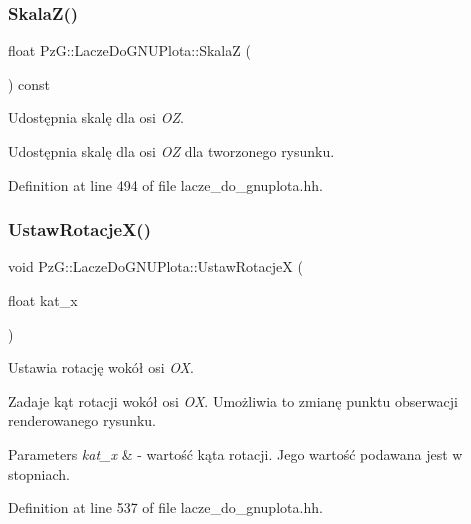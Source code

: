 \subsubsection{\texorpdfstring{Skala\+Z()}{SkalaZ()}}
{\footnotesize\ttfamily float Pz\+G\+::\+Lacze\+Do\+G\+N\+U\+Plota\+::\+SkalaZ (\begin{DoxyParamCaption}{ }\end{DoxyParamCaption}) const\hspace{0.3cm}{\ttfamily [inline]}}



Udostępnia skalę dla osi {\itshape OZ}. 

Udostępnia skalę dla osi {\itshape OZ} dla tworzonego rysunku. 

Definition at line 494 of file lacze\+\_\+do\+\_\+gnuplota.\+hh.

\mbox{\label{class_pz_g_1_1_lacze_do_g_n_u_plota_a88324c53a70846fb6bc9d918ce21fd56}} 
\subsubsection{\texorpdfstring{Ustaw\+Rotacje\+X()}{UstawRotacjeX()}}
{\footnotesize\ttfamily void Pz\+G\+::\+Lacze\+Do\+G\+N\+U\+Plota\+::\+Ustaw\+RotacjeX (\begin{DoxyParamCaption}\item[{float}]{kat\+\_\+x }\end{DoxyParamCaption})\hspace{0.3cm}{\ttfamily [inline]}}



Ustawia rotację wokół osi {\itshape OX}. 

Zadaje kąt rotacji wokół osi {\itshape OX}. Umożliwia to zmianę punktu obserwacji renderowanego rysunku. 
\begin{DoxyParams}{Parameters}
{\em kat\+\_\+x} & -\/ wartość kąta rotacji. Jego wartość podawana jest w stopniach. \\
\hline
\end{DoxyParams}


Definition at line 537 of file lacze\+\_\+do\+\_\+gnuplota.\+hh.

\mbox{\label{class_pz_g_1_1_lacze_do_g_n_u_plota_a94d8527fd78048ed6cb32ffb29e5f903}} 
